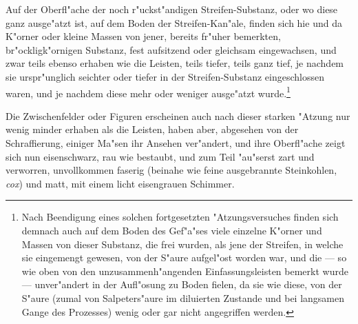 \documentclass[a4paper, 11pt, oneside, german]{article}
\begin{document}
Auf der Oberfl"ache der noch r"uckst"andigen Streifen-Substanz, oder wo diese ganz ausge"atzt ist, auf dem Boden der Streifen-Kan"ale, finden sich hie und da K"orner oder kleine Massen von jener, bereits fr"uher bemerkten, br"ockligk"ornigen Substanz, fest aufsitzend oder gleichsam eingewachsen, und zwar teils ebenso erhaben wie die Leisten, teils tiefer, teils ganz tief, je nachdem sie urspr"unglich seichter oder tiefer in der Streifen-Substanz eingeschlossen waren, und je nachdem diese mehr oder weniger ausge"atzt wurde.\footnote{Nach Beendigung eines solchen fortgesetzten "Atzungsversuches finden sich demnach auch auf dem Boden des Gef"a"ses viele einzelne K"orner und Massen von dieser Substanz, die frei wurden, als jene der Streifen, in welche sie eingemengt gewesen, von der S"aure aufgel"ost worden war, und die --- so wie oben von den unzusammenh"angenden Einfassungsleisten bemerkt wurde --- unver"andert in der Aufl"osung zu Boden fielen, da sie wie diese, von der S"aure (zumal von Salpeters"aure im diluierten Zustande und bei langsamen Gange des Prozesses) wenig oder gar nicht angegriffen werden.}

Die Zwischenfelder oder Figuren erscheinen auch nach dieser starken "Atzung nur wenig minder erhaben als die Leisten, haben aber, abgesehen von der Schraffierung, einiger Ma"sen ihr Ansehen ver"andert, und ihre Oberfl"ache zeigt sich nun eisenschwarz, rau wie bestaubt, und zum Teil "au"serst zart und verworren, unvollkommen faserig (beinahe wie feine ausgebrannte Steinkohlen, \emph{cox}) und matt, mit einem licht eisengrauen Schimmer.
\end{document}
